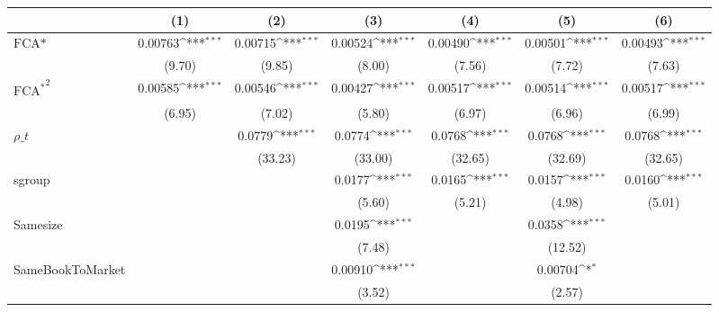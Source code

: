 {
\def\sym#1{\ifmmode^{#1}\else\(^{#1}\)\fi}
\begin{tabular}{l*{6}{c}}
\hline\hline
                    &\multicolumn{1}{c}{(1)}         &\multicolumn{1}{c}{(2)}         &\multicolumn{1}{c}{(3)}         &\multicolumn{1}{c}{(4)}         &\multicolumn{1}{c}{(5)}         &\multicolumn{1}{c}{(6)}         \\
\hline
$ \text{FCA*} $     &     0.00763\sym{***}&     0.00715\sym{***}&     0.00524\sym{***}&     0.00490\sym{***}&     0.00501\sym{***}&     0.00493\sym{***}\\
                    &      (9.70)         &      (9.85)         &      (8.00)         &      (7.56)         &      (7.72)         &      (7.63)         \\
[1em]
$ { \text{FCA}^ * } ^ 2$&     0.00585\sym{***}&     0.00546\sym{***}&     0.00427\sym{***}&     0.00517\sym{***}&     0.00514\sym{***}&     0.00517\sym{***}\\
                    &      (6.95)         &      (7.02)         &      (5.80)         &      (6.97)         &      (6.96)         &      (6.99)         \\
[1em]
 $ \rho\_t $         &                     &      0.0779\sym{***}&      0.0774\sym{***}&      0.0768\sym{***}&      0.0768\sym{***}&      0.0768\sym{***}\\
                    &                     &     (33.23)         &     (33.00)         &     (32.65)         &     (32.69)         &     (32.65)         \\
[1em]
sgroup              &                     &                     &      0.0177\sym{***}&      0.0165\sym{***}&      0.0157\sym{***}&      0.0160\sym{***}\\
                    &                     &                     &      (5.60)         &      (5.21)         &      (4.98)         &      (5.01)         \\
[1em]
Samesize            &                     &                     &      0.0195\sym{***}&                     &      0.0358\sym{***}&                     \\
                    &                     &                     &      (7.48)         &                     &     (12.52)         &                     \\
[1em]
SameBookToMarket    &                     &                     &     0.00910\sym{***}&                     &     0.00704\sym{*}  &                     \\
                    &                     &                     &      (3.52)         &                     &      (2.57)         &                     \\

\end{tabular}}
